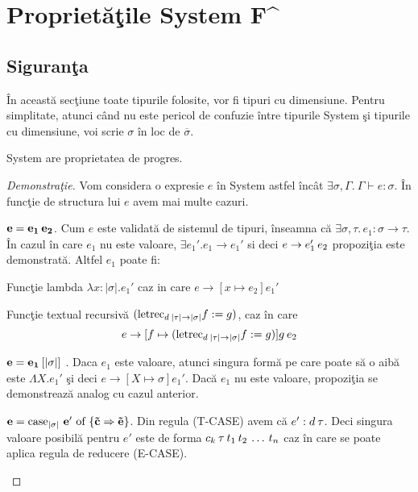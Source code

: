 
\chapter{Propriet\u a\c tile System F\^{}}
\label{Capitolul4}

\section{Siguran\c ta}
\begin{remark}
\^ In aceast\u a sec\c tiune toate tipurile folosite, vor fi tipuri cu dimensiune. Pentru simplitate, atunci c\^ and nu este pericol de confuzie \^ intre tipurile System \frec \c si tipurile cu dimensiune, voi scrie $\sigma$ \^ in loc de $\overline{\sigma}$.
\end{remark}
\begin{proposition}
System \fhat are proprietatea de progres.
\end{proposition}
\begin{proof}[Demonstra\c tie]
Vom considera o expresie $e$ \^ in System \fhat astfel \^ inc\^ at $\exists \sigma,\Gamma.\: \Gamma \vdash e : \sigma$. \^ In func\c tie de structura lui $e$ avem mai multe cazuri.
\begin{enumerate*}
  \item ${\bf e = e_1\hspace{2pt} e_2} $. Cum $e$ este validat\u a de sistemul de tipuri, \^ inseamna c\u a $\exists \sigma , \tau.\,e_1 : \sigma \to \tau$. \^ In cazul \^ in care $e_1$ nu este valoare, $\exists e_1'. e_1 \to e_1'$ si deci $e \to e_1'\hspace{2pt} e_2$ propozi\c tia este demonstrat\u a. Altfel $e_1$ poate fi:
        \begin{enumerate*}
            \item Func\c tie lambda $\lambda x : |\sigma|.e_1'$ caz in care $e \to [x \mapsto e_2] e_1'$
            \item Func\c tie textual recursiv\u a $(\text{letrec}_{d\hspace{2pt}|\tau|\to|\sigma|} f := g)$, caz \^ in care
                $$e \to [f \mapsto (\text{letrec}_{d\hspace{2pt}|\tau|\to|\sigma|} f := g)]g \hspace{2pt} e_2 $$
        \end{enumerate*}
  \item ${\bf e = e_1\hspace{2pt} [|{\sigma}|]}$ . Daca $e_1$ este valoare, atunci singura form\u a pe care poate s\u a o aib\u a este  $\Lambda X.e_1'$ \c si deci $e\to [X \mapsto {\sigma}]e_1'$. Dac\u a $e_1$ nu este valoare, propozi\c tia se demonstreaz\u a analog cu cazul anterior.
  \item ${\bf e = \text{case}_{|\sigma|}\ e' \text{ of } \{ \vec{c} \Rightarrow \vec{e} \} }$. Din regula {\scriptsize (T-CASE)} avem c\u a $e': d\hspace{2pt} \tau$. Deci singura valoare posibil\u a pentru $e'$ este de forma $c_k\hspace{2pt} \tau\hspace{2pt} t_1\hspace{2pt} t_2\hspace{2pt} \dots\hspace{2pt} t_n$ caz \^ in care se poate aplica regula de reducere {\scriptsize (E-CASE)}.\qedhere
\end{enumerate*}
\end{proof}
